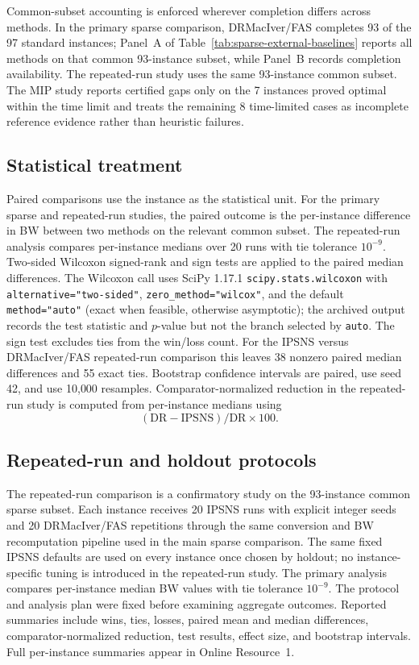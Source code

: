 Common-subset accounting is enforced wherever completion differs across methods. In the primary sparse comparison, DRMacIver/FAS completes 93 of the 97 standard instances; Panel~A of Table~\ref{tab:sparse-external-baselines} reports all methods on that common 93-instance subset, while Panel~B records completion availability. The repeated-run study uses the same 93-instance common subset. The MIP study reports certified gaps only on the 7 instances proved optimal within the time limit and treats the remaining 8 time-limited cases as incomplete reference evidence rather than heuristic failures.

\subsection{Statistical treatment}

Paired comparisons use the instance as the statistical unit. For the primary sparse and repeated-run studies, the paired outcome is the per-instance difference in BW between two methods on the relevant common subset. The repeated-run analysis compares per-instance medians over 20 runs with tie tolerance \(10^{-9}\). Two-sided Wilcoxon signed-rank and sign tests are applied to the paired median differences. The Wilcoxon call uses SciPy 1.17.1 \texttt{scipy.stats.wilcoxon} with \texttt{alternative="two-sided"}, \texttt{zero\_method="wilcox"}, and the default \texttt{method="auto"} (exact when feasible, otherwise asymptotic); the archived output records the test statistic and \(p\)-value but not the branch selected by \texttt{auto}. The sign test excludes ties from the win/loss count. For the IPSNS versus DRMacIver/FAS repeated-run comparison this leaves 38 nonzero paired median differences and 55 exact ties. Bootstrap confidence intervals are paired, use seed 42, and use 10{,}000 resamples. Comparator-normalized reduction in the repeated-run study is computed from per-instance medians using
\begin{equation}
    (\mathrm{DR}-\mathrm{IPSNS})/\mathrm{DR}\times 100.
    \label{eq:exp10-rel-excess}
\end{equation}

\subsection{Repeated-run and holdout protocols}
\label{subsec:exp10-protocol}

The repeated-run comparison is a confirmatory study on the 93-instance common sparse subset. Each instance receives 20 IPSNS runs with explicit integer seeds and 20 DRMacIver/FAS repetitions through the same conversion and BW recomputation pipeline used in the main sparse comparison. The same fixed IPSNS defaults are used on every instance once chosen by holdout; no instance-specific tuning is introduced in the repeated-run study. The primary analysis compares per-instance median BW values with tie tolerance \(10^{-9}\). The protocol and analysis plan were fixed before examining aggregate outcomes. Reported summaries include wins, ties, losses, paired mean and median differences, comparator-normalized reduction, test results, effect size, and bootstrap intervals. Full per-instance summaries appear in Online Resource~1.

